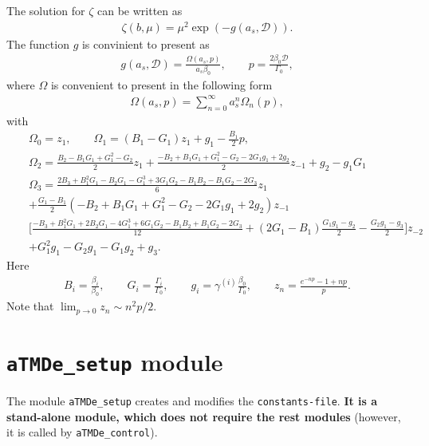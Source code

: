 \documentclass[prd,nofootinbib,eqsecnum,final]{revtex4}
\renewcommand{\(}{\left(}
\renewcommand{\)}{\right)}
\renewcommand{\[}{\left[}
\renewcommand{\]}{\right]}
\begin{document}
The solution for $\zeta$ can be written as
\begin{eqnarray}
\zeta(b,\mu)=\mu^2 \exp\(-g(a_s,\mathcal{D})\).
\end{eqnarray}
The function $g$ is convinient to present as
\begin{eqnarray}
g(a_s,\mathcal{D})=\frac{\Omega(a_s,p)}{a_s\beta_0},\qquad p=\frac{2\beta_0 \mathcal{D}}{\Gamma_0},
\end{eqnarray}
where $\Omega$ is convenient to present in the following form
\begin{eqnarray}
\Omega(a_s,p)=\sum_{n=0}^\infty a_s^n \Omega_n(p),
\end{eqnarray}
with
\begin{eqnarray*}
&&\Omega_0=z_1,\qquad \Omega_1=(B_1-G_1)z_1+g_1-\frac{B_1}{2}p,
\\
&& 
\Omega_2=\frac{B_2-B_1G_1+G_1^2-G_2}{2}z_1+\frac{-B_2+B_1G_1+G_1^2-G_2-2G_1g_1+2g_2}{2}z_{-1}+g_2-g_1G_1
\\
&&
\Omega_3=\frac{2B_3+B_1^2G_1-B_2G_1-G_1^3+3 G_1G_2-B_1B_2-B_1G_2-2G_3}{6}z_1
\\&&
+\frac{G_1-B_1}{2}\(-B_2+B_1G_1+G_1^2-G_2-2G_1g_1+2g_2\)z_{-1}
\\&&
\Big[\frac{-B_3+B_1^2G_1+2B_2G_1-4G_1^3+6G_1G_2-B_1B_2+B_1G_2-2G_3}{12}+(2G_1-B_1)\frac{G_1g_1-g_2}{2}-\frac{G_2g_1-g_3}{2}\Big]z_{-2}
\\&&
+G_1^2g_1-G_2g_1-G_1g_2+g_3.
\end{eqnarray*}
Here
\begin{eqnarray}
B_i=\frac{\beta_i}{\beta_0},\qquad G_i=\frac{\Gamma_i}{\Gamma_0},\qquad g_i=\gamma^{(i)}\frac{\beta_0}{\Gamma_0},\qquad z_n=\frac{e^{-n p}-1+n p}{p}.
\end{eqnarray}
Note that  $\lim_{p\to 0}z_n\sim n^2 p/2$.

\newpage

\section{\texttt{aTMDe\_setup} module}
\label{aTMDe_setup}

The module \texttt{aTMDe\_setup} creates and modifies the \texttt{constants-file}. \textbf{It is a stand-alone module, which does not require the rest modules} (however, it is called by \texttt{aTMDe\_control}).
\end{document}
